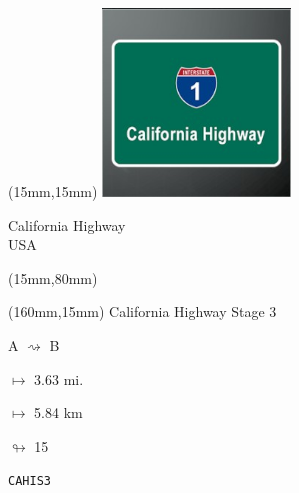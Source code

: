 \begin{textblock*}{50mm}(15mm,15mm)%
\includegraphics[width=50mm]{LG/2015-05-20_00077.png}
\par California Highway\\ USA
\end{textblock*}
\begin{textblock*}{185mm}(15mm,80mm)%
\end{textblock*}
\begin{textblock*}{40mm}(160mm,15mm)%
California Highway Stage 3
\par A $\rightsquigarrow$ B
\Large
\par$\mapsto$ 3.63 mi.
\par$\mapsto$ 5.84 km
\par$\looparrowright$ 15
\par\hfill\tiny\tt CAHIS3\\
\end{textblock*}
\null\newpage

